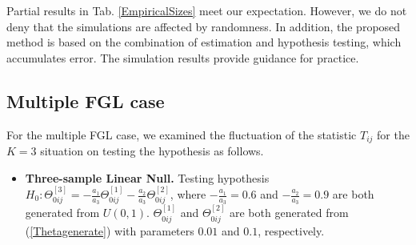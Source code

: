 \documentclass[review]{elsarticle}
\newcommand{\1}{{\bf 1}}
\newcommand{\0}{{\bf 0}}
\begin{document}
\begin{table}[htbp]
\begin{center}
\end{center}
\end{table}

 Partial results in Tab. \ref{EmpiricalSizes} meet our expectation.
 However, we do not deny that the simulations are affected by randomness.
 In addition, the proposed method is based on the combination of estimation and hypothesis testing, which accumulates error.
 The simulation results provide guidance for practice.

\subsection{Multiple FGL case}

 For the multiple FGL case, we examined the fluctuation of the statistic $T_{ij}$ for the $K=3$ situation on testing the hypothesis as follows.
 \begin{itemize}
   \item {\bf Three-sample Linear Null.} Testing hypothesis $H_0: \Theta^{[3]}_{0ij}=-\frac{a_1}{a_3}\Theta^{[1]}_{0ij}-\frac{a_2}{a_3}\Theta^{[2]}_{0ij}$,
 where $-\frac{a_1}{a_3}=0.6$ and $-\frac{a_2}{a_3}=0.9$ are both generated from $U(0,1)$.
 $\Theta^{[1]}_{0ij}$ and $\Theta^{[2]}_{0ij}$ are both generated from (\ref{Thetagenerate}) with parameters $0.01$ and $0.1$, respectively.
 \end{itemize}
\end{document}
